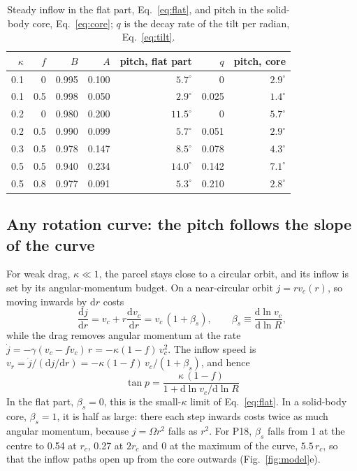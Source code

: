 \documentclass[11pt,a4paper]{article}
\newcommand{\dd}{\mathrm{d}}
\newcommand{\rc}{r_c}
\begin{document}
\begin{table}[h]
\centering\small
\caption{Steady inflow in the flat part, Eq.~\eqref{eq:flat}, and pitch in the
solid-body core, Eq.~\eqref{eq:core}; $q$ is the decay rate of the tilt per radian,
Eq.~\eqref{eq:tilt}.}
\label{tab:flat}
\begin{tabular}{rrrrrrr}
\toprule
$\kappa$ & $f$ & $B$ & $A$ & pitch, flat part & $q$ & pitch, core\\
\midrule
0.1 & 0 & 0.995 & 0.100 & $5.7^\circ$ & 0 & $2.9^\circ$\\
0.1 & 0.5 & 0.998 & 0.050 & $2.9^\circ$ & 0.025 & $1.4^\circ$\\
0.2 & 0 & 0.980 & 0.200 & $11.5^\circ$ & 0 & $5.7^\circ$\\
0.2 & 0.5 & 0.990 & 0.099 & $5.7^\circ$ & 0.051 & $2.9^\circ$\\
0.3 & 0.5 & 0.978 & 0.147 & $8.5^\circ$ & 0.078 & $4.3^\circ$\\
0.5 & 0.5 & 0.940 & 0.234 & $14.0^\circ$ & 0.142 & $7.1^\circ$\\
0.5 & 0.8 & 0.977 & 0.091 & $5.3^\circ$ & 0.210 & $2.8^\circ$\\
\bottomrule
\end{tabular}
\end{table}

\subsection{Any rotation curve: the pitch follows the slope of the curve}
For weak drag, $\kappa\ll1$, the parcel stays close to a circular orbit, and its
inflow is set by its angular-momentum budget. On a near-circular orbit $j=rv_c(r)$,
so moving inwards by $\dd r$ costs
\begin{equation}
  \frac{\dd j}{\dd r}=v_c+r\frac{\dd v_c}{\dd r}=v_c\,(1+\beta_s),
  \qquad\beta_s\equiv\frac{\dd\ln v_c}{\dd\ln R},
\end{equation}
while the drag removes angular momentum at the rate
$\dot j=-\gamma(v_c-fv_c)\,r=-\kappa(1-f)\,v_c^2$. The inflow speed is
$v_r=\dot j/(\dd j/\dd r)=-\kappa(1-f)\,v_c/(1+\beta_s)$, and hence
\begin{equation}
  \boxed{\;\tan p=\frac{\kappa\,(1-f)}{1+\dd\ln v_c/\dd\ln R}\;}
  \label{eq:general}
\end{equation}
In the flat part, $\beta_s=0$, this is the small-$\kappa$ limit of
Eq.~\eqref{eq:flat}. In a solid-body core, $\beta_s=1$, it is half as large: there
each step inwards costs twice as much angular momentum, because $j=\Omega r^2$
falls as $r^2$. For P18, $\beta_s$ falls from 1 at the centre to 0.54 at $\rc$, 0.27
at $2\rc$ and 0 at the maximum of the curve, $5.5\,\rc$, so that the inflow paths
open up from the core outwards (Fig.~\ref{fig:model}e).
\end{document}
